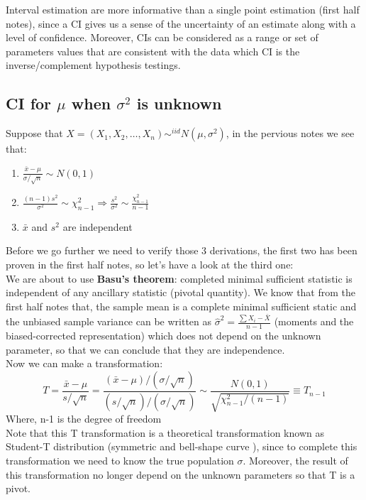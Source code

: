 \documentclass[12pt ]{article}
\begin{document}
Interval estimation are more informative than a single point estimation (first half notes), since a CI gives us a sense of the uncertainty of an estimate along with a level of confidence. Moreover, CIs can be considered as a range or set of parameters values that are consistent with the data which CI is the inverse/complement hypothesis testings.

\subsection{CI for $\mu$ when $\sigma^2$ is unknown}
Suppose that $X = (X_{1}, X_{2}, \ldots, X_{n}) \sim^{iid} N(\mu, \sigma^2)$, in the pervious notes we see that:
\begin{enumerate}
\item $\frac{\bar{x} - \mu}{\sigma / \sqrt{n}} \sim N(0, 1)$
\item $\frac{(n-1)s^2}{\sigma^2} \sim \chi^2_{n-1} \Rightarrow \frac{s^2}{\sigma^2} \sim \frac{\chi^2_{n-1}}{n-1}$
\item $\bar{x}$ and $s^2$ are independent
\end{enumerate}
\color{blue}
Before we go further we need to verify those 3 derivations, the first two has been proven in the first half notes, so let's have a look at the third one: \\
We are about to use \textbf{Basu's theorem}: completed minimal sufficient statistic is independent of any ancillary statistic (pivotal quantity). We know that from the first half notes that, the sample mean is a complete minimal sufficient static and the unbiased sample variance can be written as $\hat{\sigma}^2 = \frac{\sum X_{i} - \bar{X}}{n-1}$ (moments and the biased-corrected representation) which does not depend on the unknown parameter, so that we can conclude that they are independence.\\

\color{black}
Now we can make a transformation:
\begin{equation*}
T = \frac{\bar{x} - \mu}{s / \sqrt{n}} = \frac{(\bar{x} - \mu) / (\sigma / \sqrt{n})}{(s / \sqrt{n}) / (\sigma / \sqrt{n})} \sim \frac{N(0,1)}{\sqrt{\chi^2_{n-1} / (n-1)}} \equiv T_{n-1}
\end{equation*}
Where, n-1 is the degree of freedom \\
Note that this T transformation is a theoretical transformation known as Student-T distribution (symmetric and bell-shape curve ), since to complete this transformation we need to know the true population $\sigma$. Moreover, the result of this transformation no longer depend on the unknown parameters so that T is a pivot.\\
\end{document}
